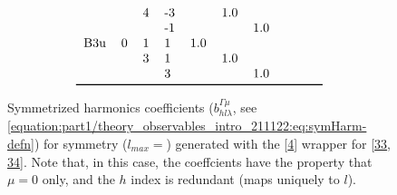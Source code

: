 \documentclass[letterpaper,table,10pt,english]{jupyterBook}
\begin{document}
\begin{figure}[htbp]
\begin{equation*}
\begin{split}
\begin{tabular}{llllllllll}
    &   & 4 & -3 &      &  1.0 &      &      &      &      \\
    &   &   & -1 &      &      &  1.0 &      &      &      \\
B3u & 0 & 1 &  1 &  1.0 &      &      &      &      &      \\
    &   & 3 &  1 &      &  1.0 &      &      &      &      \\
    &   &   &  3 &      &      &  1.0 &      &      &      \\
\bottomrule
\end{tabular}\end{split}
\end{equation*}\caption{Symmetrized harmonics coefficients (\(b_{hl\lambda}^{\Gamma\mu}\), see \eqref{equation:part1/theory_observables_intro_211122:eq:symHarm-defn}) for  symmetry (\(l_{max}=\)) generated with the  {[}\hyperlink{cite.backmatter/bibliography:id574}{4}{]} wrapper for  {[}\hyperlink{cite.backmatter/bibliography:id593}{33}, \hyperlink{cite.backmatter/bibliography:id594}{34}{]}. Note that, in this case, the coeffcients have the property that \(\mu=0\) only, and the \(h\) index is redundant (maps uniquely to \(l\)).}\label{\detokenize{part1/theory_tensor_formalism_201122:tab-d2hxlm}}\end{figure}
\end{document}
